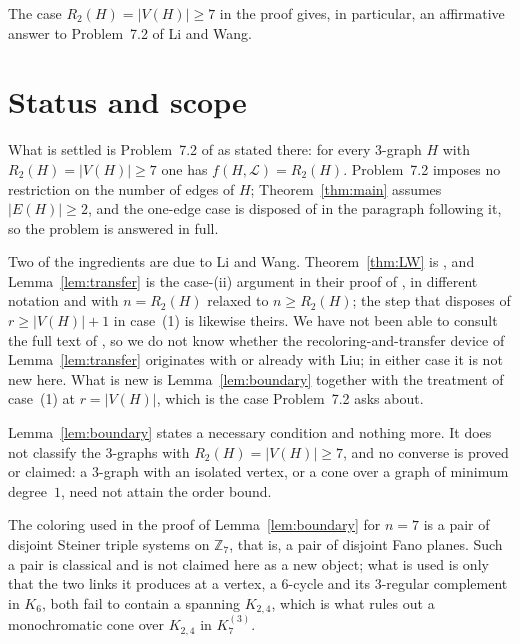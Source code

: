 \documentclass[11pt]{amsart}
\newcommand{\Lpath}{\mathcal L}
\newcommand{\Z}{\mathbb Z}
\begin{document}
The case $R_2(H)=|V(H)|\ge7$ in the proof gives, in particular, an
affirmative answer to Problem~7.2 of Li and Wang.

\section*{Status and scope}

What is settled is Problem~7.2 of \cite{LiWang} as stated there: for every
$3$-graph $H$ with $R_2(H)=|V(H)|\ge7$ one has $f(H,\Lpath)=R_2(H)$.
Problem~7.2 imposes no restriction on the number of edges of $H$;
Theorem~\ref{thm:main} assumes $|E(H)|\ge2$, and the one-edge case is
disposed of in the paragraph following it, so the problem is answered in
full.

Two of the ingredients are due to Li and Wang.
Theorem~\ref{thm:LW} is \cite[Theorem~1.5]{LiWang}, and
Lemma~\ref{lem:transfer} is the case-(ii) argument in their proof of
\cite[Theorem~1.10]{LiWang}, in different notation and with $n=R_2(H)$
relaxed to $n\ge R_2(H)$; the step that disposes of $r\ge|V(H)|+1$ in
case~(1) is likewise theirs. We have not been able to consult the full
text of \cite{Liu}, so we do not know whether the recoloring-and-transfer
device of Lemma~\ref{lem:transfer} originates with \cite{LiWang} or
already with Liu; in either case it is not new here. What is new is
Lemma~\ref{lem:boundary} together with the treatment of case~(1) at
$r=|V(H)|$, which is the case Problem~7.2 asks about.

Lemma~\ref{lem:boundary} states a necessary condition and nothing more. It
does not classify the $3$-graphs with $R_2(H)=|V(H)|\ge7$, and no converse
is proved or claimed: a $3$-graph with an isolated vertex, or a cone over a
graph of minimum degree~$1$, need not attain the order bound.

The coloring used in the proof of Lemma~\ref{lem:boundary} for $n=7$ is a
pair of disjoint Steiner triple systems on $\Z_7$, that is, a pair of
disjoint Fano planes. Such a pair is classical and is not claimed here as a
new object; what is used is only that the two links it produces at a
vertex, a $6$-cycle and its $3$-regular complement in $K_6$, both fail to
contain a spanning $K_{2,4}$, which is what rules out a monochromatic cone
over $K_{2,4}$ in $K_7^{(3)}$.
\end{document}
